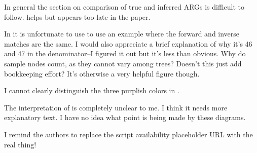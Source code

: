 \reply{
}

\begin{point}{}
In general the section on comparison of true and inferred ARGs is
difficult to follow.  helps but appears too late in the
paper.
\end{point}

\reply{
}

\begin{point}{} %
In  it is unfortunate to use to use an example where
the forward and inverse matches are the same. I would also appreciate
a brief explanation of why it's 46 and 47 in the denominator--I figured
it out but it's less than obvious. Why do sample nodes count, as they
cannot vary among trees? Doesn't this just add bookkeeping effort?
It's otherwise a very helpful figure though.
\end{point}

\reply{
}

\begin{point}{} %
I cannot clearly distinguish the three purplish colors in .
\end{point}

\reply{
}

\begin{point}{} %
The interpretation of  is completely unclear to me. I
think it needs more explanatory text. I have no idea what point is being
made by these diagrams.
\end{point}

\reply{
}

\begin{point}{} %
I remind the authors to replace the script availability placeholder
URL with the real thing! 
\end{point}

\reply{
}

